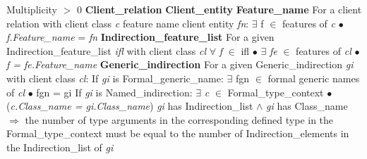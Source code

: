 \indent \indent \indent Multiplicity $>$ 0\newline
\indent \textbf{Client\_relation}\newline
\indent \indent \textbf{Client\_entity}\newline
\indent \indent \indent \textbf{Feature\_name}\newline
\indent \indent \indent \indent For a client relation with client class \textit{c} feature name client entity \textit{fn}:\newline
\indent \indent \indent \indent \indent $\exists$ f $\in$ features of \textit{c} $\bullet$ \textit{f.Feature\_name} = \textit{fn}\newline
\indent \indent \indent \textbf{Indirection\_feature\_list}\newline
\indent \indent \indent \indent For a given Indirection\_feature\_list \textit{ifl} with client class \textit{cl}\newline
\indent \indent \indent \indent $\forall$ \textit{f} $\in$ ifl $\bullet$ $\exists$ \textit{fe} $\in$ features of \textit{cl} $\bullet$ \textit{f = fe.Feature\_name}\newline
\indent \indent \indent \textbf{Generic\_indirection}\newline
\indent \indent \indent \indent For a given Generic\_indirection \textit{gi} with client class \textit{cl}:\newline
\indent \indent \indent \indent If \textit{gi} is Formal\_generic\_name:\newline
\indent \indent \indent \indent \indent $\exists$ fgn $\in$ formal generic names of \textit{cl} $\bullet$ fgn = gi\newline
\indent \indent \indent \indent If \textit{gi} is Named\_indirection:\newline
\indent \indent \indent \indent \indent $\exists$ \textit{c} $\in$ Formal\_type\_context $\bullet$ (\textit{c.Class\_name = gi.Class\_name})\newline\newline
\indent \indent \indent \indent \indent \textit{gi} has Indirection\_list $\wedge$ \textit{gi} has Class\_name $\Rightarrow$ the number of type arguments in \newline 
\indent \indent \indent \indent \indent the corresponding defined type in the Formal\_type\_context must be equal to the \newline
\indent \indent \indent \indent \indent number of Indirection\_elements in the Indirection\_list of \textit{gi} \newline\newline
